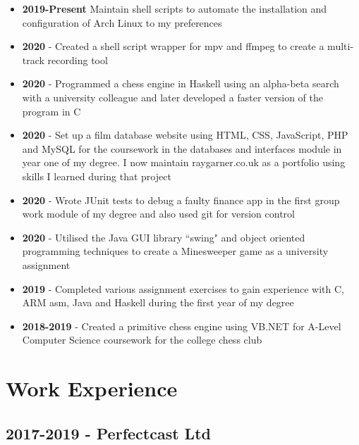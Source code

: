\documentclass{article}
\begin{document}
\begin{itemize}[noitemsep]

\item \textbf{2019-Present} Maintain shell scripts to automate the installation and configuration of Arch Linux to my preferences 
\item \textbf{2020} - Created a shell script wrapper for mpv and ffmpeg to create a multi-track recording tool
\item \textbf{2020} - Programmed a chess engine in Haskell using an alpha-beta search with a university colleague and later developed a faster version of the program in C
\item \textbf{2020} - Set up a film database website using HTML, CSS, JavaScript, PHP and MySQL for the coursework in the databases and interfaces module in year one of my degree. I now maintain raygarner.co.uk as a portfolio using skills I learned during that project
\item \textbf{2020} - Wrote JUnit tests to debug a faulty finance app in the first group work module of my degree and also used git for version control
\item \textbf{2020} - Utilised the Java GUI library ``swing" and object oriented programming techniques to create a Minesweeper game as a university assignment
\item \textbf{2019} - Completed various assignment exercises to gain experience with C, ARM asm, Java and Haskell during the first year of my degree
\item \textbf{2018-2019} - Created a primitive chess engine using VB.NET for A-Level Computer Science coursework for the college chess club

\end{itemize}





\section{Work Experience}
\subsection{2017-2019 - Perfectcast Ltd}

\end{document}
